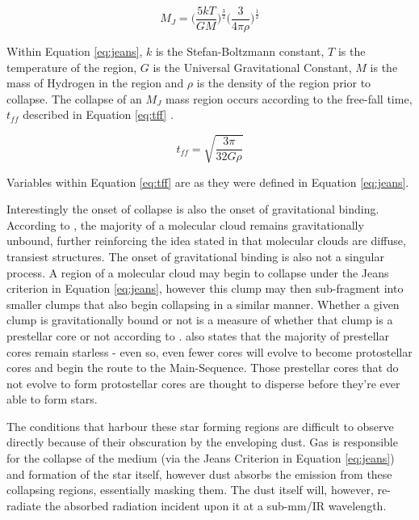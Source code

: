 \documentclass{report}
\begin{document}
\begin{equation}\label{eq:jeans}
  M_{J} = \Bigg( \frac{5kT}{GM} \Bigg )^\frac{3}{2} \Bigg( \frac{3}{4\pi\rho} \Bigg )^\frac{1}{2}
\end{equation}

Within Equation \ref{eq:jeans}, $k$ is the Stefan-Boltzmann constant, $T$ is the temperature of the region, $G$ is the Universal Gravitational Constant, $M$ is the mass of Hydrogen in the region and $\rho$ is the density of the region prior to collapse. The collapse of an $M_{J}$ mass region occurs according to the free-fall time, $t_{ff}$ described in Equation \ref{eq:tff} \parencite{krumholz}.

\begin{equation}\label{eq:tff}
  t_{ff} = \sqrt{\frac{3\pi}{32G\rho}}
\end{equation}

Variables within Equation \ref{eq:tff} are as they were defined in Equation \ref{eq:jeans}.

Interestingly the onset of collapse is also the onset of gravitational binding. According to \textcite{bound}, the majority of a molecular cloud remains gravitationally unbound, further reinforcing the idea stated in \textcite{evo-mol} that molecular clouds are diffuse, transiest structures. The onset of gravitational binding is also not a singular process. A region of a molecular cloud may begin to collapse under the Jeans criterion in Equation \ref{eq:jeans}, however this clump may then sub-fragment into smaller clumps that also begin collapsing in a similar manner. Whether a given clump is gravitationally bound or not is a measure of whether that clump is a prestellar core or not according to \textcite{prestellar}. \textcite{prestellar} also states that the majority of prestellar cores remain starless - even so, even fewer cores will evolve to become protostellar cores and begin the route to the Main-Sequence. Those prestellar cores that do not evolve to form protostellar cores are thought to disperse before they're ever able to form stars.

The conditions that harbour these star forming regions are difficult to observe directly because of their obscuration by the enveloping dust. Gas is responsible for the collapse of the medium (via the Jeans Criterion in Equation \ref{eq:jeans}) and formation of the star itself, however dust absorbs the emission from these collapsing regions, essentially masking them. The dust itself will, however, re-radiate the absorbed radiation incident upon it at a sub-mm/IR wavelength.
\end{document}
